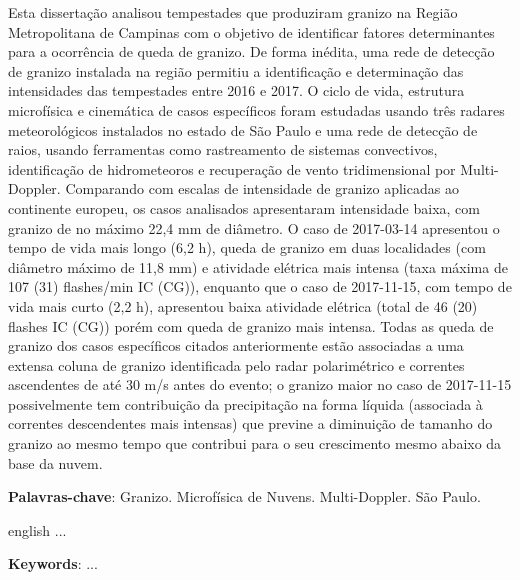 
\setlength{\absparsep}{18pt} %
\begin{resumo}
 Esta dissertação analisou tempestades que produziram granizo na Região Metropolitana de Campinas com o objetivo de identificar fatores determinantes para a ocorrência de queda de granizo. De forma inédita, uma rede de detecção de granizo instalada na região permitiu a identificação e determinação das intensidades das tempestades entre 2016 e 2017. O ciclo de vida, estrutura microfísica e cinemática de casos específicos foram estudadas usando três radares meteorológicos instalados no estado de São Paulo e uma rede de detecção de raios, usando ferramentas como rastreamento de sistemas convectivos, identificação de hidrometeoros e recuperação de vento tridimensional por Multi-Doppler. Comparando com escalas de intensidade de granizo aplicadas ao continente europeu, os casos analisados apresentaram intensidade baixa, com granizo de no máximo 22,4 mm de diâmetro. O caso de 2017-03-14 apresentou o tempo de vida mais longo (6,2 h), queda de granizo em duas localidades (com diâmetro máximo de 11,8 mm) e atividade elétrica mais intensa (taxa máxima de 107 (31) flashes/min IC (CG)), enquanto que o caso de 2017-11-15, com tempo de vida mais curto (2,2 h), apresentou baixa atividade elétrica (total de 46 (20) flashes IC (CG)) porém com queda de granizo mais intensa. Todas as queda de granizo dos casos específicos citados anteriormente estão associadas a uma extensa coluna de granizo identificada pelo radar polarimétrico e correntes ascendentes de até 30 m/s antes do evento; o granizo maior no caso de 2017-11-15 possivelmente tem contribuição da precipitação na forma líquida (associada à correntes descendentes mais intensas) que previne a diminuição de tamanho do granizo ao mesmo tempo que contribui para o seu crescimento mesmo abaixo da base da nuvem.

 \textbf{Palavras-chave}: Granizo. Microfísica de Nuvens. Multi-Doppler. São Paulo.
\end{resumo}

\begin{resumo}[Abstract]
 \begin{otherlanguage*}{english}
   ...

   \vspace{\onelineskip}
 
   \noindent 
   \textbf{Keywords}: ...
 \end{otherlanguage*}
\end{resumo}
